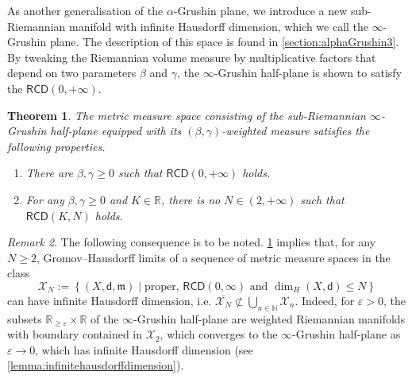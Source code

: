 \documentclass[11pt,twoside,a4paper]{article}
\newcommand{\red}{\color{red}}
\newcommand{\blue}{\color{blue}}
\newcommand{\N}{\mathbb{N}}
\newcommand{\R}{\mathbb{R}}
\newcommand{\RCD}{\mathsf{RCD}}
\newcommand{\di}
{\mathsf d} %
\newcommand{\m}{\mathfrak m} %
\renewcommand{\epsilon}{\varepsilon}
\theoremstyle{theorem}
\newtheorem{theorem}{Theorem}[section]
\theoremstyle{definition}
\theoremstyle{remark}
\newtheorem{remark}[theorem]{Remark}
\theoremstyle{proof}
\begin{document}
As another generalisation of the $\alpha$-Grushin plane, we introduce a new sub-Riemannian manifold with infinite Hausdorff dimension, which we call the $\infty$-Grushin plane.
The description of this space is found in \cref{section:alphaGrushin3}.
By tweaking the Riemannian volume measure by multiplicative factors that depend on two parameters $\beta$ and $\gamma$,
the $\infty$-Grushin half-plane is shown to satisfy the $\RCD(0,+\infty)$.

\begin{theorem}
\label{thm:main3}
   The metric measure space consisting of the sub-Riemannian $\infty$-Grushin half-plane equipped with its $(\beta, \gamma)$-weighted measure satisfies the following properties.
\begin{enumerate}[label=\normalfont(\roman*)]
    \item There are $\beta,\gamma\geq 0$ such that $\RCD(0,+\infty)$ holds.
    \item For any $\beta,\gamma\geq 0$ and $K\in \R$, there is no $N\in(2,+\infty)$ such that $\RCD(K,N)$ holds.
\end{enumerate}
\end{theorem}



  \begin{remark}\label{rmk:compact}
    The following consequence is to be noted.
\cref{thm:main3} implies that, for any $N\geq 2$, Gromov--Hausdorff limits of a sequence of metric measure spaces in the class
    \[\mathcal{X}_N:=\left\{(X,\di,\m)\mid \text{proper, }\RCD(0,\infty) \text{ and } \dim_H(X,\di)\leq N\right\}\]
    can have infinite Hausdorff dimension, i.e. $\overline{\mathcal{X}_N}\not\subset \bigcup_{n\in\N}\mathcal{X}_n$.
    Indeed, for $\epsilon>0$, the subsets $\R_{\geq \epsilon}\times \R$ of the $\infty$-Grushin half-plane are weighted Riemannian manifolds with boundary contained in $\mathcal{X}_2$,
    which converges to the $\infty$-Grushin half-plane as $\epsilon\to 0$, which has infinite Hausdorff dimension (see \cref{lemma:infinitehausdorffdimension}).
\end{remark}
\end{document}
